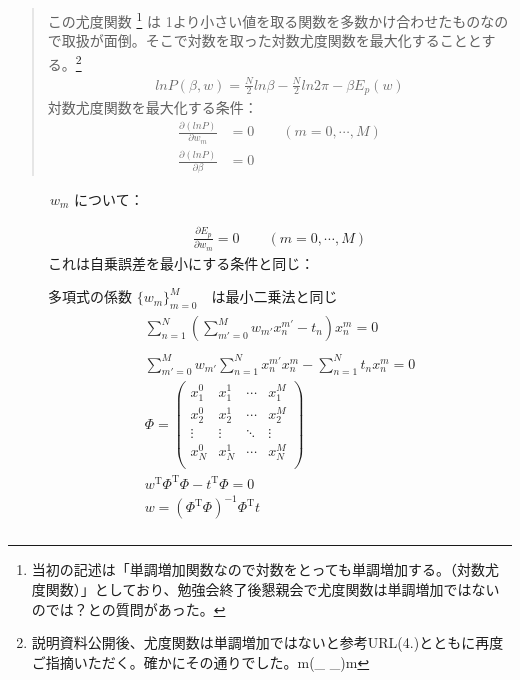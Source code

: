 \documentclass[letterpaper,10pt,dvipdfmx]{sphinxmanual}
\begin{document}
\begin{quote}
この尤度関数 \footnote[1]{\sphinxAtStartFootnote%
当初の記述は「単調増加関数なので対数をとっても単調増加する。（対数尤度関数）」としており、勉強会終了後懇親会で尤度関数は単調増加ではないのでは？との質問があった。
}  は
1より小さい値を取る関数を多数かけ合わせたものなので取扱が面倒。そこで対数を取った対数尤度関数を最大化することとする。\footnote[2]{\sphinxAtStartFootnote%
説明資料公開後、尤度関数は単調増加ではないと参考URL(4.)とともに再度ご指摘いただく。確かにその通りでした。m(\_ \_)m
}
\begin{equation*}
\begin{split}ln P(\beta,w) = \frac{N}{2}ln \beta - \frac{N}{2} ln 2 \pi - \beta E_p(w)\end{split}
\end{equation*}
対数尤度関数を最大化する条件：
\begin{equation*}
\begin{split}\frac{\partial (ln P)}{\partial w_m} &= 0  \qquad       (m = 0, \cdots, M) \\
\frac{\partial (ln P)}{\partial \beta} &= 0\end{split}
\end{equation*}\end{quote}
\begin{description}
\item[{　　　\(w_m\) について：}] \leavevmode\begin{equation*}
\begin{split}\frac{\partial E_p}{\partial w_m} = 0 \qquad (m =0, \cdots,M)\end{split}
\end{equation*}
これは自乗誤差を最小にする条件と同じ：

多項式の係数 \(\{w_m\}_{m=0}^{M}\)　は最小二乗法と同じ
\begin{align*}\!\begin{aligned}
\sum_{n=1}^{N} \left ( \sum_{m'=0}^{M} w_{m'} x_n^{m'} -t_n \right ) x_n^m = 0 \\\\
\sum_{m'=0}^{M} w_{m'} \sum_{n=1}^{N} x_n^{m'} x_{n}^{m} - \sum_{n=1}^{N} t_n x_n^m = 0\\
\Phi = \left ( \begin{array}{llll}
         x_1^0 & x_1^1 & \cdots & x_1^M \\
         x_2^0 & x_2^1 & \cdots & x_2^M \\
         \vdots & \vdots & \ddots & \vdots \\
          x_N^0 & x_N^1 & \cdots & x_N^M \\
          \end{array} \right )\\
w^{\mathrm{T}} \Phi^{\mathrm{T}} \Phi - t^{\mathrm{T}} \Phi = 0\\
w = (\Phi^{\mathrm{T}} \Phi)^{-1} \Phi^{\mathrm{T}} t\\
\end{aligned}\end{align*}
\end{description}
\end{document}
